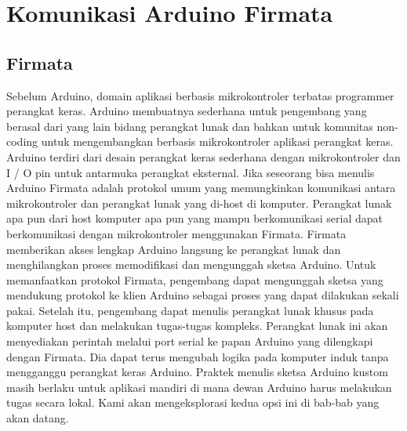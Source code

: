 \section{Komunikasi Arduino Firmata}
\subsection{Firmata}
	Sebelum Arduino, domain aplikasi berbasis mikrokontroler terbatas programmer perangkat keras. Arduino membuatnya sederhana untuk pengembang yang berasal dari yang lain bidang perangkat lunak dan bahkan untuk komunitas non-coding untuk mengembangkan berbasis mikrokontroler aplikasi perangkat keras. Arduino terdiri dari desain perangkat keras sederhana dengan mikrokontroler dan I / O pin untuk antarmuka perangkat eksternal. Jika seseorang bisa menulis Arduino 
	Firmata adalah protokol umum yang memungkinkan komunikasi antara mikrokontroler dan perangkat lunak yang di-host di komputer. 
	Perangkat lunak apa pun dari host komputer apa pun yang mampu berkomunikasi serial dapat berkomunikasi dengan mikrokontroler menggunakan Firmata. 
	Firmata memberikan akses lengkap Arduino langsung ke perangkat lunak dan menghilangkan proses memodifikasi dan mengunggah sketsa Arduino. 
	Untuk memanfaatkan protokol Firmata, pengembang dapat mengunggah sketsa yang mendukung protokol ke klien Arduino sebagai proses yang dapat dilakukan sekali pakai. 
	Setelah itu, pengembang dapat menulis perangkat lunak khusus pada komputer host dan melakukan tugas-tugas kompleks. Perangkat lunak ini akan menyediakan perintah melalui port serial ke papan Arduino yang dilengkapi dengan Firmata. Dia dapat terus mengubah logika pada komputer induk tanpa mengganggu perangkat keras Arduino. 
	Praktek menulis sketsa Arduino kustom masih berlaku untuk aplikasi mandiri di mana dewan Arduino harus melakukan tugas secara lokal. Kami akan mengeksplorasi kedua opsi ini di bab-bab yang akan datang.
	
